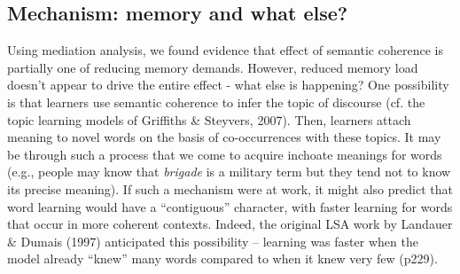 \documentclass[man,floatsintext]{apa6}
\begin{document}

\subsection{Mechanism: memory and what else?}

Using mediation analysis, we found evidence that effect of semantic coherence is partially one of reducing memory demands. However, reduced memory load doesn't appear to drive the entire effect - what else is happening? One possibility is that learners use semantic coherence to infer the topic of discourse (cf. the topic learning models of Griffiths \& Steyvers, 2007). Then, learners attach meaning to novel words on the basis of co-occurrences with these topics. It may be through such a process that we come to acquire inchoate meanings for words (e.g., people may know that \emph{brigade} is a military term but they tend not to know its precise meaning). If such a mechanism were at work, it might also predict that word learning would have a ``contiguous'' character, with faster learning for words that occur in more coherent contexts. Indeed, the original LSA work by Landauer \& Dumais (1997) anticipated this possibility -- learning was faster when the model already ``knew'' many words compared to when it knew very few (p229).


\nocite{*}
\newpage


\end{document}
